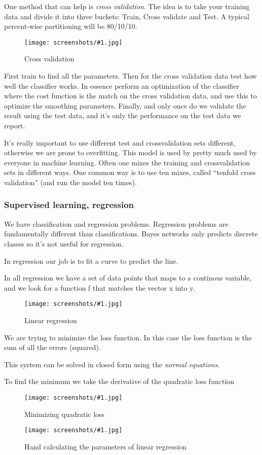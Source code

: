 \documentclass[a4, 12pt, english, USenglish]{scrreprt}
\newcommand{\screenshot}[2]{
\begin{figure}[htb]
\texttt{[image: screenshots/\#1.jpg]}
\label{#1}
\caption{#2}
\end{figure}}
\newcommand{\idx}[1]{{\em #1}\index{#1}}
\begin{document}
One method that can help is \idx{cross validation}.  The idea is to
take your training data and divide it into three buckets: Train, Cross
validate and Test.  A typical percent-wise partitioning will be 80/10/10.

\screenshot{crossvalidation}{Cross validation}

First train to find all the parameters.   Then for the cross
validation data test how well the classifier works.  In essence
perform an optimization of the classifier where the cost function is
the match on the cross validation data, and use this to optimize the
smoothing parameters.  Finally, and only once do we validate the
result using the test data, and it's only the performance on the test
data we report.

It's really important to use different test and crossvalidation sets
different, otherwise we are prone to overfitting.  This model is used
by pretty much used by everyone in machine learning.    Often one
mixes the training and crossvalidation sets in different ways.  One
common way is to use ten mixes, called ``tenfold cross validation''
(and run the model ten times).


\subsubsection{Supervised learning, regression}

We have classification and regression problems.  Regression problems
are fundamentally different than classifications.   Bayes networks
only predicts discrete classes so it's not useful for regression.

In regression our job is to fit a curve to predict the line.

In all regression we have a set of data points that maps to a
continous variable, and we look for a function f that matches the
vector x into y. 

\screenshot{linearregression}{Linear regression}

We are trying to minimize the loss function.  In this case the loss
function is the sum of all the errors (squared).

This system can be solved in closed form using the \idx{normal
  equations}.

To find the minimum we take the derivative of the quadratic loss
function

\screenshot{minimizingquadraticloss0}{Minimizing quadratic loss}

\screenshot{minimizingquadraticloss}{Hand calculating the parameters
  of linear regression}
\end{document}
